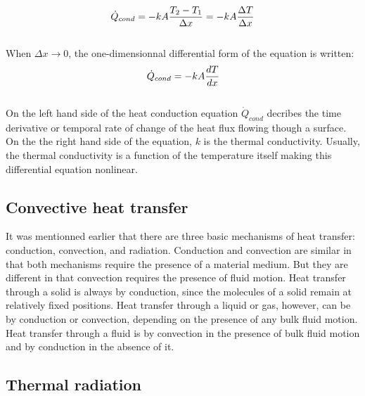 \\
\begin{equation}
    \dot{Q}_{cond} = -kA\frac{T_2 - T_1}{\Delta x} = -kA\frac{\Delta T}{\Delta x}
    \tagaddtext{[\si{\watt}]}
    \label{eqn:CondEqInt}
\end{equation}
\\
\normalsize{When $\Delta x \rightarrow 0$,  the one-dimensionnal differential form of the equation is written:}
\\
\begin{equation}
    \dot{Q}_{cond} = -kA\frac{dT}{dx}
    \tagaddtext{[\si{\watt}]}
    \label{eqn:CondEq2}
\end{equation}
\\
\normalsize{\indent On the left hand side of the heat conduction equation  $\dot{Q}_{cond}$ decribes the time derivative or temporal rate of change of the heat flux flowing though a surface. On the the right hand side of the equation, $k$ is the thermal conductivity. Usually, the thermal conductivity is a function of the temperature itself making this differential equation nonlinear. }
\\
\subsection{Convective heat transfer}
\normalsize{It was mentionned earlier that there are three basic mechanisms of heat transfer: conduction, convection, and radiation. Conduction and convection are similar in that both mechanisms require the presence of a material medium. But they are different in that convection requires the presence of fluid motion. Heat transfer through a solid is always by conduction, since the molecules of a solid remain at relatively fixed positions. Heat transfer through a liquid or
gas, however, can be by conduction or convection, depending on the presence of any bulk fluid motion. Heat transfer through a fluid is by convection in the presence of bulk fluid motion and by conduction in the absence of it.}
\subsection{Thermal radiation}